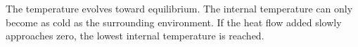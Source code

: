 The temperature evolves toward equilibrium.  
The internal temperature can only become as cold as the surrounding environment.  
If the heat flow added slowly approaches zero, the lowest internal temperature is reached.